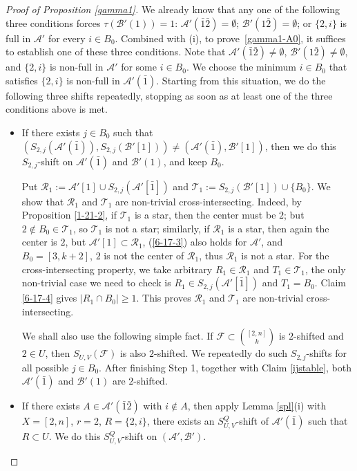 \documentclass[a4paper,11pt]{article}
\newcommand{\m}{\mathcal}
\begin{document}
\begin{proof}[Proof of Proposition \ref{gamma1}]
We already know that any one of the following three conditions forces $\tau(\m B'(1))=1$:
$\m A'(\bar1\bar2)=\emptyset$; $\m B'(1\bar2)=\emptyset$; or $\{2,i\}$ is full in
$\m A'$ for every $i\in B_0$. Combined with (i),  to prove~\eqref{gamma1-A0},
it suffices to establish one of these three conditions.
Note that $\m A'(\bar1\bar2)\ne\emptyset$, $\m B'(1\bar2)\ne\emptyset$,
and $\{2,i\}$ is non-full in $\m A'$ for some $i\in B_0$. 
We choose the minimum $i\in B_0$ that satisfies $\{2,i\}$ is non-full in $\m A'(\bar1)$. 
Starting from this situation,
we do the following three shifts repeatedly, stopping as soon as at least one of the three conditions above is met.

\begin{itemize}
\item[Step 1.]
If there exists $j\in B_0$ such that $(S_{2,j}(\m A'(\bar1)), S_{2,j}(\m B'[1]))\ne (\m A'(\bar1), \m B'[1])$, then we do this $S_{2,j}$-shift on $\m A'(\bar1)$ and $\m B'(1)$, and keep $B_0$.  

Put $\m R_1:=\m A'[1]\cup S_{2,j}(\m A'[\bar1])$ and $\m T_1:=S_{2,j}(\m B'[1])\cup \{B_0\}$.
We show that $\m R_1 $ and $ \m T_1$ are non-trivial cross-intersecting. Indeed, by Proposition \ref{1-21-2}, if $\m T_1$ is a star, then the center must be $2$; but $2\notin B_0\in \m T_1$, so 
$\m T_1$ is not a star; similarly, if $\m R_1$ is a star, then again the center is $2$, but $\m A'[1]\subset \m R_1$, (\ref{6-17-3}) also holds for $\m A'$, and $B_0=[3,k+2]$, $2$ is not the center of $\m R_1$, thus $\m R_1$ is not a star. For the cross-intersecting property, we take arbitrary $R_1\in \m R_1$ and $T_1\in \m T_1$, the only non-trivial case we need to check is $R_1\in S_{2,j}(\m A'[\bar1])$ and $T_1=B_0$. Claim \ref{6-17-4} gives $|R_1\cap B_0|\ge 1$. This proves $\m R_1 $ and $ \m T_1$ are non-trivial cross-intersecting. 

We shall also use the following simple fact. If $\m F\subset { [2,n]\choose k}$
is $2$-shifted and $2\in U$, then $S_{U,V}(\m F)$ is also $2$-shifted.
We repeatedly do such $S_{2,j}$-shifts for all possible $j\in B_0$.
After finishing Step 1, together with Claim \ref{ijstable}, both $\m A'(\bar1)$ and $\m B'(1)$ are $2$-shifted. 

\item[Step 2.] 
If there exists $A\in \m A'(\bar 1\bar 2)$ with $i\not\in A$, then apply Lemma \ref{spl}(i) with $X=[2,n]$,
$r=2$, $R=\{2,i\}$, there exists an $S_{U,V}^Q$-shift of $\m A'(\bar1)$ such that $R\subset U$. We do this $S_{U,V}^Q$-shift on $(\m A', \m B')$. 


\end{itemize}
\end{proof}
\end{document}

